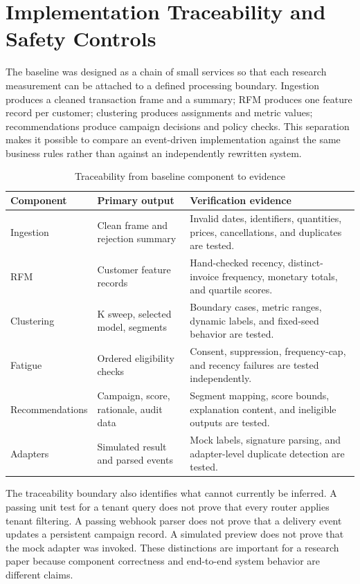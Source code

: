 \documentclass[conference]{IEEEtran}
\begin{document}
\section{Implementation Traceability and Safety Controls}
The baseline was designed as a chain of small services so that each research measurement can be attached to a defined processing boundary. Ingestion produces a cleaned transaction frame and a summary; RFM produces one feature record per customer; clustering produces assignments and metric values; recommendations produce campaign decisions and policy checks. This separation makes it possible to compare an event-driven implementation against the same business rules rather than against an independently rewritten system.

\begin{table}[!t]
\caption{Traceability from baseline component to evidence}
\label{tab:traceability}
\centering
\scriptsize
\begin{tabular}{p{}p{}p{}}
\toprule
Component & Primary output & Verification evidence \\
\midrule
Ingestion & Clean frame and rejection summary & Invalid dates, identifiers, quantities, prices, cancellations, and duplicates are tested. \\
RFM & Customer feature records & Hand-checked recency, distinct-invoice frequency, monetary totals, and quartile scores. \\
Clustering & K sweep, selected model, segments & Boundary cases, metric ranges, dynamic labels, and fixed-seed behavior are tested. \\
Fatigue & Ordered eligibility checks & Consent, suppression, frequency-cap, and recency failures are tested independently. \\
Recommendations & Campaign, score, rationale, audit data & Segment mapping, score bounds, explanation content, and ineligible outputs are tested. \\
Adapters & Simulated result and parsed events & Mock labels, signature parsing, and adapter-level duplicate detection are tested. \\
\bottomrule
\end{tabular}
\end{table}

The traceability boundary also identifies what cannot currently be inferred. A passing unit test for a tenant query does not prove that every router applies tenant filtering. A passing webhook parser does not prove that a delivery event updates a persistent campaign record. A simulated preview does not prove that the mock adapter was invoked. These distinctions are important for a research paper because component correctness and end-to-end system behavior are different claims.
\end{document}
